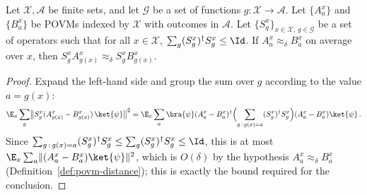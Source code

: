 \begin{lemma}\label{fact:add-a-proj2}
	\leanok
	Let $\mathcal X, \mathcal A$ be finite sets, and let $\mathcal G$ be a set of functions $g \colon \mathcal X \to \mathcal A$. Let $\{A^x_a\}$ and $\{B^x_a\}$ be POVMs indexed by $\mathcal X$ with outcomes in $\mathcal A$. Let $\{S^x_g\}_{x \in \mathcal X,\, g \in \mathcal G}$ be a set of operators such that for all $x \in \mathcal X$, $\sum_g (S^x_g)^\dagger S^x_g \le \Id$. If $A^x_a \approx_\delta B^x_a$ on average over $x$, then $S^x_g A^x_{g(x)} \approx_\delta S^x_g B^x_{g(x)}$.
\end{lemma}
\begin{proof}
	\leanok
	Expand the left-hand side and group the sum over $g$ according to the value $a = g(x)$:
	\[
		\E_x \sum_g \bigl\lVert S^x_g (A^x_{g(x)} - B^x_{g(x)})\, \ket{\psi} \bigr\rVert^2
		= \E_x \sum_a \bra{\psi} (A^x_a - B^x_a)^\dagger \Bigl( \sum_{g\,:\,g(x)=a} (S^x_g)^\dagger S^x_g \Bigr) (A^x_a - B^x_a) \ket{\psi}\,.
	\]
	Since $\sum_{g\,:\,g(x)=a} (S^x_g)^\dagger S^x_g \le \sum_g (S^x_g)^\dagger S^x_g \le \Id$, this is at most $\E_x \sum_a \lVert (A^x_a - B^x_a)\ket{\psi} \rVert^2$, which is $O(\delta)$ by the hypothesis $A^x_a \approx_\delta B^x_a$ (Definition~\ref{def:povm-distance}); this is exactly the bound required for the conclusion.
\end{proof}

